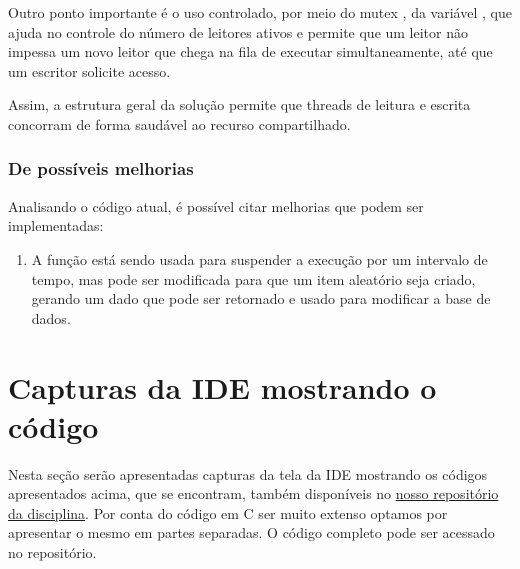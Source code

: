 \documentclass[
	12pt,				%
	openright,			%
	oneside,			%
	a4paper,			%
	chapter=TITLE,		%
	english,			%
	french,				%
	spanish,			%
	brazil				%
	]{abntex2}
\theoremstyle{definition}
\begin{document}
Outro ponto importante é o uso controlado, por meio do mutex , da variável , que ajuda no controle do número de leitores ativos e permite que um leitor não impessa um novo leitor que chega na fila de executar simultaneamente, até que um escritor solicite acesso.

Assim, a estrutura geral da solução permite que threads de leitura e escrita concorram de forma saudável ao recurso compartilhado.

\subsubsection{De possíveis melhorias}

Analisando o código atual, é possível citar melhorias que podem ser implementadas:
\begin{enumerate}
    \item A função  está sendo usada para suspender a execução por um intervalo de tempo, mas pode ser modificada para que um item aleatório seja criado, gerando um dado que pode ser retornado e usado para modificar a base de dados.
\end{enumerate}
\newpage
\section{Capturas da IDE mostrando o código}

Nesta seção serão apresentadas capturas da tela da IDE mostrando os códigos apresentados acima, que se encontram, também disponíveis no
\href{https://github.com/jvictorferreira3301/Sistemas_Operacionais}{nosso repositório da disciplina}.
Por conta do código em C ser muito extenso optamos por apresentar o mesmo em partes separadas. O código completo pode ser acessado no repositório.
\end{document}
